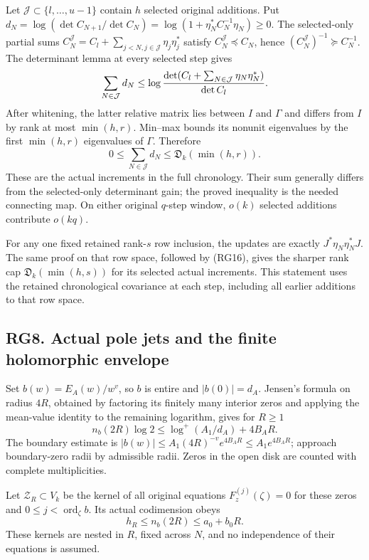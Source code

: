 \documentclass[11pt]{article}
\begin{document}
Let \(\mathcal J\subset\{l,\ldots,u-1\}\) contain \(h\) selected original additions. Put \(d_N=\log(\det C_{N+1}/\det C_N)=\log(1+\eta_N^*C_N^{-1}\eta_N)\ge0\). The selected-only partial sums \(C_N^{\mathcal J}=C_l+\sum_{j<N,j\in\mathcal J}\eta_j\eta_j^*\) satisfy \(C_N^{\mathcal J}\preceq C_N\), hence \((C_N^{\mathcal J})^{-1}\succeq C_N^{-1}\). The determinant lemma at every selected step gives \[
\sum_{N\in\mathcal J}d_N
\le\log{\det(C_l+\sum_{N\in\mathcal J}\eta_N\eta_N^*)\over\det C_l}.
\] After whitening, the latter relative matrix lies between \(I\) and \(\Gamma\) and differs from \(I\) by rank at most \(\min(h,r)\). Min--max bounds its nonunit eigenvalues by the first \(\min(h,r)\) eigenvalues of \(\Gamma\). Therefore \[
0\le\sum_{N\in\mathcal J}d_N\le\mathfrak D_k(\min(h,r)).
\tag{RG21}
\] These are the actual increments in the full chronology. Their sum generally differs from the selected-only determinant gain; the proved inequality is the needed connecting map. On either original \(q\)-step window, \(o(k)\) selected additions contribute \(o(kq)\).

For any one fixed retained rank-\(s\) row inclusion, the updates are exactly \(J^*\eta_N\eta_N^*J\). The same proof on that row space, followed by (RG16), gives the sharper rank cap \(\mathfrak D_k(\min(h,s))\) for its selected actual increments. This statement uses the retained chronological covariance at each step, including all earlier additions to that row space.

\subsection{RG8. Actual pole jets and the finite holomorphic envelope}\label{rg8.-actual-pole-jets-and-the-finite-holomorphic-envelope}

Set \(b(w)=E_A(w)/w^v\), so \(b\) is entire and \(|b(0)|=d_A\). Jensen's formula on radius \(4R\), obtained by factoring its finitely many interior zeros and applying the mean-value identity to the remaining logarithm, gives for \(R\ge1\) \[
n_b(2R)\log2\le\log^+(A_1/d_A)+4B_AR.
\tag{RG22}
\] The boundary estimate is \(|b(w)|\le A_1(4R)^{-v}e^{4B_AR}\le A_1e^{4B_AR}\); approach boundary-zero radii by admissible radii. Zeros in the open disk are counted with complete multiplicities.

Let \(\mathcal Z_R\subset V_k\) be the kernel of all original equations \(F_z^{(j)}(\zeta)=0\) for these zeros and \(0\le j<\operatorname{ord}_\zeta b\). Its actual codimension obeys \[
h_R\le n_b(2R)\le a_0+b_0R.
\tag{RG23}
\] These kernels are nested in \(R\), fixed across \(N\), and no independence of their equations is assumed.
\end{document}
